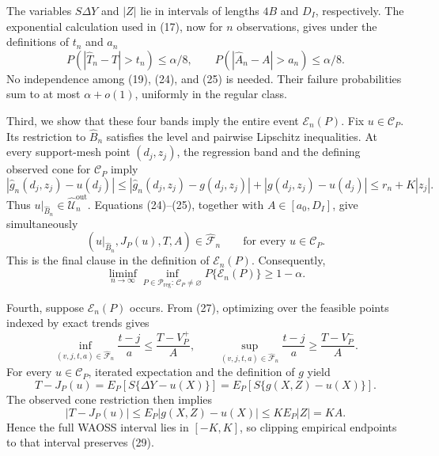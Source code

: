 The variables \(S\Delta Y\) and \(|Z|\) lie in intervals of lengths \(4B\) and \(D_I\), respectively. The exponential calculation used in (17), now for \(n\) observations, gives under the definitions of \(t_n\) and \(a_n\)
\[
 P(|\widehat T_n-T|>t_n)\leq\alpha/8,
 \qquad
 P(|\widehat A_n-A|>a_n)\leq\alpha/8.                            \tag{25}
\]
No independence among (19), (24), and (25) is needed. Their failure probabilities sum to at most \(\alpha+o(1)\), uniformly in the regular class.

Third, we show that these four bands imply the entire event \(\mathcal E_n(P)\). Fix \(u\in\mathcal C_P\). Its restriction to \(\widehat B_n\) satisfies the level and pairwise Lipschitz inequalities. At every support-mesh point \((d_j,z_j)\), the regression band and the defining observed cone for \(\mathcal C_P\) imply
\[
 |\widehat g_n(d_j,z_j)-u(d_j)|
 \leq|\widehat g_n(d_j,z_j)-g(d_j,z_j)|+|g(d_j,z_j)-u(d_j)|
 \leq r_n+K|z_j|.                                                \tag{26}
\]
Thus \(u|_{\widehat B_n}\in\widehat{\mathcal U}_n^{\mathrm{out}}\). Equations (24)--(25), together with \(A\in[a_0,D_I]\), give simultaneously
\[
 (u|_{\widehat B_n},J_P(u),T,A)\in\widehat{\mathscr F}_n
 \qquad\text{for every }u\in\mathcal C_P.                        \tag{27}
\]
This is the final clause in the definition of \(\mathcal E_n(P)\). Consequently,
\[
 \liminf_{n\to\infty}\inf_{P\in\mathcal P_{\mathrm{reg}}:\,\mathcal C_P\neq\varnothing}
 P\{\mathcal E_n(P)\}\geq1-\alpha.                             \tag{28}
\]

Fourth, suppose \(\mathcal E_n(P)\) occurs. From (27), optimizing over the feasible points indexed by exact trends gives
\[
 \inf_{(v,j,t,a)\in\widehat{\mathscr F}_n}\frac{t-j}{a}
 \leq\frac{T-V_P^+}{A},
 \qquad
 \sup_{(v,j,t,a)\in\widehat{\mathscr F}_n}\frac{t-j}{a}
 \geq\frac{T-V_P^-}{A}.                                         \tag{29}
\]
For every \(u\in\mathcal C_P\), iterated expectation and the definition of \(g\) yield
\[
 T-J_P(u)
 =E_P[S\{\Delta Y-u(X)\}]
 =E_P[S\{g(X,Z)-u(X)\}].                                        \tag{30}
\]
The observed cone restriction then implies
\[
 |T-J_P(u)|\leq E_P|g(X,Z)-u(X)|\leq KE_P|Z|=KA.                 \tag{31}
\]
Hence the full WAOSS interval lies in \([-K,K]\), so clipping empirical endpoints to that interval preserves (29).

